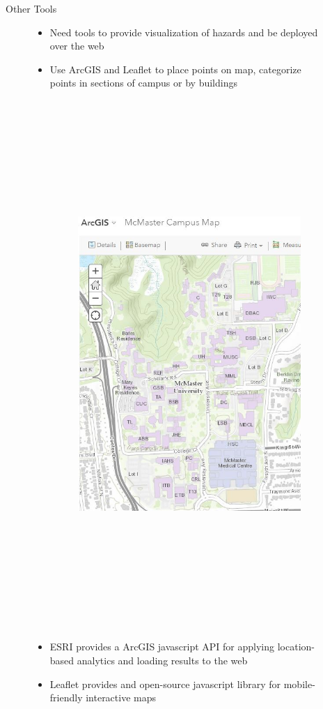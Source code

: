\documentclass[22pt]{beamer}
\begin{document}
\begin{frame}[fragile]
\begin{textblock}{3.5}
\begin{block}{Other Tools}
\begin{figure}[htbp] %
\begin{itemize}
\item Need tools to provide visualization of hazards and be deployed over the web
\item Use ArcGIS and Leaflet to place points on map, categorize points in sections of campus or by buildings
\begin{figure}
   \centering
   \includegraphics[height=20cm]{pinpointr-map.jpg}
   \label{fig:map}
\end{figure}
\item ESRI provides a ArcGIS javascript API for applying location-based analytics and loading results to the web
\item Leaflet provides and open-source javascript library for mobile-friendly interactive maps
\end{itemize}
\end{figure}
\end{block}


\end{textblock}
\end{frame}
\end{document}
